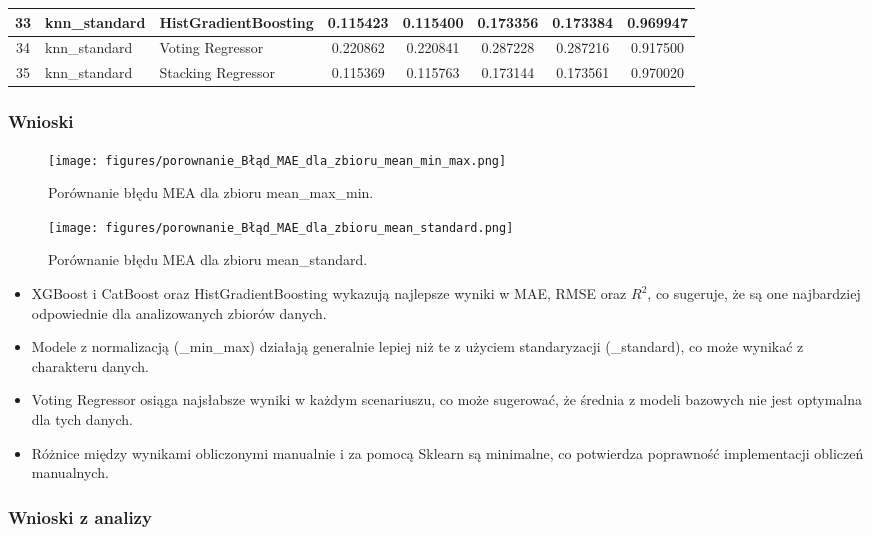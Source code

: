 \documentclass[10pt,letterpaper]{article}
\begin{document}
\begin{landscape}
\begin{table}[H]
\begin{tabular}{|c|l|l|c|c|c|c|c|}
33 & knn\_standard & HistGradientBoosting & 0.115423 & 0.115400 & 0.173356 & 0.173384 & 0.969947 \\ \hline
34 & knn\_standard & Voting Regressor & 0.220862 & 0.220841 & 0.287228 & 0.287216 & 0.917500 \\ \hline
35 & knn\_standard & Stacking Regressor & 0.115369 & 0.115763 & 0.173144 & 0.173561 & 0.970020 \\ \hline
\end{tabular}
\end{table}
\end{landscape}

\newpage
\subsubsection{Wnioski}

\begin{figure}[H]
	\centering
	\texttt{[image: figures/porownanie\_Błąd\_MAE\_dla\_zbioru\_mean\_min\_max.png]}
	\caption{Porównanie błędu MEA dla zbioru mean\_max\_min.}
	\label{fig:mea2}
\end{figure}

\begin{figure}[H]
	\centering
	\texttt{[image: figures/porownanie\_Błąd\_MAE\_dla\_zbioru\_mean\_standard.png]}
	\caption{Porównanie błędu MEA dla zbioru mean\_standard.}
	\label{fig:mea3}
\end{figure}

\newpage
\begin{itemize}
	\item XGBoost i CatBoost oraz HistGradientBoosting wykazują najlepsze wyniki w MAE, RMSE oraz \(R^2\), co sugeruje, że są one najbardziej odpowiednie dla analizowanych zbiorów danych.
	\item Modele z normalizacją (\_min\_max) działają generalnie lepiej niż te z użyciem standaryzacji (\_standard), co może wynikać z charakteru danych.
	\item Voting Regressor osiąga najsłabsze wyniki w każdym scenariuszu, co może sugerować, że średnia z modeli bazowych nie jest optymalna dla tych danych.
	\item Różnice między wynikami obliczonymi manualnie i za pomocą Sklearn są minimalne, co potwierdza poprawność implementacji obliczeń manualnych.
\end{itemize}

\subsubsection{Wnioski z analizy}
\end{document}
